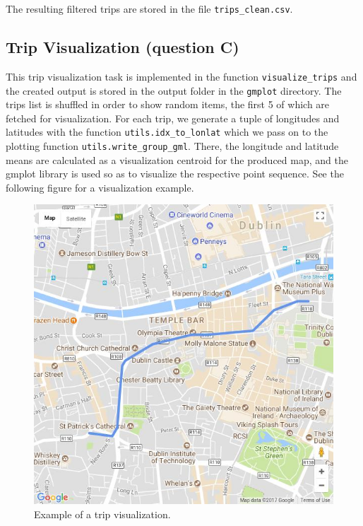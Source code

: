 \documentclass[12pt]{article}
\begin{document}
	The resulting filtered trips are stored in the file \texttt{trips\_clean.csv}.
	
	\subsection{Trip Visualization (question C)}
	This trip visualization task is implemented in the function
  \texttt{visualize\_trips} and the created output is stored in the output
  folder in the \texttt{gmplot} directory. The trips list is shuffled in order
  to show random items, the first 5 of which are fetched for
  visualization. For each trip, we generate a tuple of longitudes and latitudes
  with the function \texttt{utils.idx\_to\_lonlat} which we pass on to the
  plotting function \texttt{utils.write\_group\_gml}. There, the longitude and
  latitude means are calculated as a visualization centroid for the produced map, and the gmplot
  library is used so as to visualize the respective point sequence. See the
  following figure for a visualization example. 
	
	\begin{figure} [H]
		\begin{center}
			\includegraphics [scale = 0.75] {questionCexample.jpg}
			\caption{Example of a trip visualization.}
		\end{center}
    \label{gmlplot_example}
	\end{figure} 
	
\end{document}

